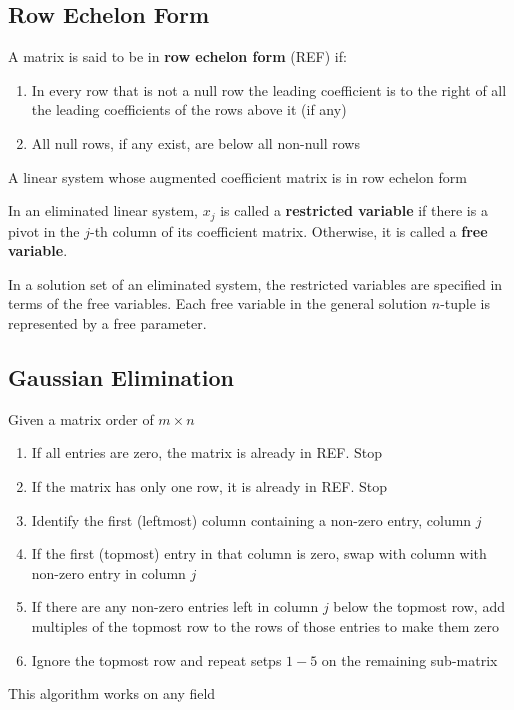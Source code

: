 \subsection{Row Echelon Form}
\begin{definition}[REF]\label{def:ref}
    A matrix is said to be in \textbf{row echelon form} (REF) if:
    \begin{enumerate}
        \item In every row that is not a null row the leading coefficient is to the right of all the leading coefficients of the rows above it (if any)
        \item All null rows, if any exist, are below all non-null rows
    \end{enumerate}
\end{definition}
\begin{definition}\label{def:eliminated-system}
    A linear system whose augmented coefficient matrix is in row echelon form
\end{definition}
\begin{definition}\label{def:restricted-and-free-variables}
    In an eliminated linear system, $x_j$ is called a \textbf{restricted variable} if there is a pivot in the $j$-th column of its coefficient matrix. Otherwise, it is called a \textbf{free variable}.
\end{definition}
\begin{note}
    In a solution set of an eliminated system, the restricted variables are specified in terms of the free variables. Each free variable in the general solution $n$-tuple is represented by a free parameter.
\end{note}

\subsection{Gaussian Elimination}
Given a matrix order of $m \times n$
\begin{enumerate}
    \item If all entries are zero, the matrix is already in REF. Stop
    \item If the matrix has only one row, it is already in REF. Stop
    \item Identify the first (leftmost) column containing a non-zero entry, column $j$
    \item If the first (topmost) entry in that column is zero, swap with column with non-zero entry in column $j$
    \item If there are any non-zero entries left in column $j$ below the topmost row, add multiples of the topmost row to the rows of those entries to make them zero
    \item Ignore the topmost row and repeat setps $1-5$ on the remaining sub-matrix
\end{enumerate}
\begin{note}
    This algorithm works on any field
\end{note}